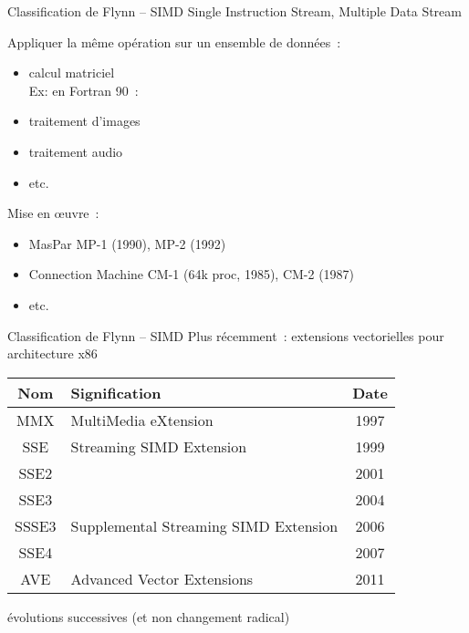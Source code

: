 \begin {frame} {Classification de Flynn -- SIMD}
    Single Instruction Stream, Multiple Data Stream

    \vspace* {3mm}

    Appliquer la même opération sur un ensemble de données~:
    \begin {itemize}
	\item calcul matriciel \\
	    Ex: en Fortran 90~: 
	\item traitement d'images
	\item traitement audio
	\item etc.
    \end {itemize}

    \vspace* {2mm}

    Mise en {\oe}uvre~:
    \begin {itemize}
	\item MasPar MP-1 (1990), MP-2 (1992)
	\item Connection Machine CM-1 (64k proc, 1985), CM-2 (1987)
	\item etc.
    \end {itemize}

\end {frame}

\begin {frame} {Classification de Flynn -- SIMD}
    Plus récemment~: extensions vectorielles pour architecture x86

    \begin {center}
	\small
	\begin {tabular} {|c|l|c|} \hline
	    \textbf {Nom} & \textbf {Signification} & \textbf {Date} \\ \hline
	    MMX & MultiMedia eXtension & 1997 \\ \hline
	    SSE & Streaming SIMD Extension & 1999 \\ \hline
	    SSE2 & & 2001 \\ \hline
	    SSE3 & & 2004 \\ \hline
	    SSSE3 & Supplemental Streaming SIMD Extension & 2006 \\ \hline
	    SSE4 & & 2007 \\ \hline
	    AVE & Advanced Vector Extensions & 2011 \\ \hline
	\end {tabular}
    \end {center}

    \vspace* {3mm}
    \implique évolutions successives (et non changement radical)
    
\end {frame}

